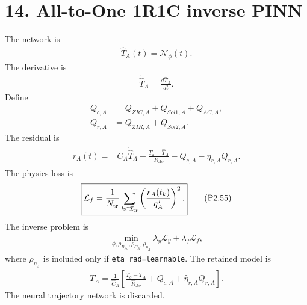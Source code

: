 \documentclass[11pt]{article}
\begin{document}
\section*{14. All-to-One 1R1C inverse PINN}
The network is
\begin{align}
\boxed{\widehat T_A(t)=\mathcal N_\phi(t).}
\tag{P2.52}
\end{align}
The derivative is
\begin{align}
\boxed{\dot{\widehat T}_A=\frac{d\widehat T_A}{dt}.}
\tag{P2.53}
\end{align}
Define
\begin{align}
Q_{c,A}&=Q_{ZIC,A}+Q_{Sol1,A}+Q_{AC,A},\\
Q_{r,A}&=Q_{ZIR,A}+Q_{Sol2,A}.
\end{align}
The residual is
\begin{align}
\boxed{\begin{aligned}
r_A(t)={}&C_A\dot{\widehat T}_A-\frac{T_o-\widehat T_A}{R_{Ao}}-Q_{c,A}-\eta_{r,A}Q_{r,A}.
\end{aligned}}
\tag{P2.54}
\end{align}
The physics loss is
\begin{align}
\boxed{\mathcal L_f=\frac{1}{N_{\rm tr}}\sum_{k\in\mathcal I_{\rm tr}}\left(\frac{r_A(t_k)}{q_A^\star}\right)^2.}
\tag{P2.55}
\end{align}
The inverse problem is
\begin{align}
\boxed{\min_{\phi,\rho_{R_{Ao}},\rho_{C_A},\rho_{\eta_A}}\lambda_y\mathcal L_y+\lambda_f\mathcal L_f,}
\tag{P2.56}
\end{align}
where \(\rho_{\eta_A}\) is included only if \texttt{eta\_rad=learnable}. The retained model is
\begin{align}
\boxed{\dot T_A=\frac{1}{\widehat C_A}\left[\frac{T_o-T_A}{\widehat R_{Ao}}+Q_{c,A}+\widehat\eta_{r,A}Q_{r,A}\right].}
\tag{P2.57}
\end{align}
The neural trajectory network is discarded.
\end{document}
